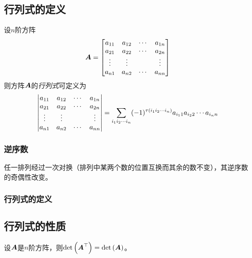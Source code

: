 \documentclass{ctexart}
\begin{document}
\subsection{行列式的定义}

\begin{definition}[行列式]
    设\(n\)阶方阵
    \begin{equation*}
        \mata=\sqmat{bmatrix}{a}{n}
    \end{equation*}
    则方阵\(\mata\)的\emph{行列式}可定义为
    \begin{equation*}
        \sqmat{vmatrix}{a}{n}=\sum_{i_1i_2\cdots i_n}(-1)^{\tau\mypar{i_1i_2\cdots i_n}}a_{i_11}a_{i_22}\cdots a_{i_nn}
    \end{equation*}
\end{definition}

\subsubsection*{逆序数}

\begin{theorem}
    任一排列经过一次对换（排列中某两个数的位置互换而其余的数不变），其逆序数的奇偶性改变。
\end{theorem}

\subsubsection*{行列式的定义}

\subsection{行列式的性质}

\begin{property}
    设\(\mata\)是\(n\)阶方阵，则\(\det{\mata^\top}=\det{\mata}\)。
\end{property}
\end{document}
